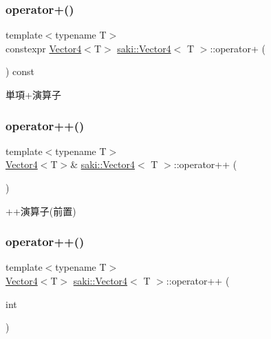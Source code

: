 \subsubsection{\texorpdfstring{operator+()}{operator+()}}
{\footnotesize\ttfamily template$<$typename T$>$ \\
constexpr \mbox{\hyperlink{classsaki_1_1_vector4}{Vector4}}$<$T$>$ \mbox{\hyperlink{classsaki_1_1_vector4}{saki\+::\+Vector4}}$<$ T $>$\+::operator+ (\begin{DoxyParamCaption}{ }\end{DoxyParamCaption}) const\hspace{0.3cm}{\ttfamily [inline]}}



単項+演算子 

\mbox{\label{classsaki_1_1_vector4_a50362014413b4c4ebcb567878a0c60bc}} 
\subsubsection{\texorpdfstring{operator++()}{operator++()}\hspace{0.1cm}{\footnotesize\ttfamily [1/2]}}
{\footnotesize\ttfamily template$<$typename T$>$ \\
\mbox{\hyperlink{classsaki_1_1_vector4}{Vector4}}$<$T$>$\& \mbox{\hyperlink{classsaki_1_1_vector4}{saki\+::\+Vector4}}$<$ T $>$\+::operator++ (\begin{DoxyParamCaption}{ }\end{DoxyParamCaption})\hspace{0.3cm}{\ttfamily [inline]}}



++演算子(前置) 

\mbox{\label{classsaki_1_1_vector4_a6232a0e038857d54e9e977c82e064491}} 
\subsubsection{\texorpdfstring{operator++()}{operator++()}\hspace{0.1cm}{\footnotesize\ttfamily [2/2]}}
{\footnotesize\ttfamily template$<$typename T$>$ \\
\mbox{\hyperlink{classsaki_1_1_vector4}{Vector4}}$<$T$>$ \mbox{\hyperlink{classsaki_1_1_vector4}{saki\+::\+Vector4}}$<$ T $>$\+::operator++ (\begin{DoxyParamCaption}\item[{int}]{ }\end{DoxyParamCaption})\hspace{0.3cm}{\ttfamily [inline]}}



